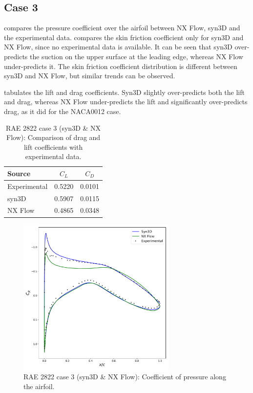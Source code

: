 \subsection{Case 3}
%
%
 compares the pressure coefficient over the airfoil between NX Flow, syn3D and the experimental data.  compares the skin friction coefficient only for syn3D and NX Flow, since no experimental data is available. It can be seen that syn3D over-predicts the suction on the upper surface at the leading edge, whereas NX Flow under-predicts it. The skin friction coefficient distribution is different between syn3D and NX Flow, but similar trends can be observed.

 tabulates the lift and drag coefficients. Syn3D slightly over-predicts both the lift and drag, whereas NX Flow under-predicts the lift and significantly over-predicts drag, as it did for the NACA0012 case.
\begin{table}
    \centering
    \caption{RAE 2822 case 3 (syn3D \& NX Flow): Comparison of drag and lift coefficients with experimental data.}
    \label{tab:raecase3}
    \begin{tabular}{@{}lcc@{}}
        \toprule
        Source & $C_L$ & $C_D$ \\
        \midrule
        Experimental & 0.5220 & 0.0101 \\
        syn3D & 0.5907 & 0.0115 \\
        NX Flow & 0.4865 & 0.0348 \\
         \bottomrule
    \end{tabular}
\end{table}
\begin{figure}
    \centering
    \includegraphics[width=0.7\textwidth]{figs/rae/cp_case3}
    \caption{RAE 2822 case 3 (syn3D \& NX Flow): Coefficient of pressure along the airfoil.}
    \label{fig:raecp3}
\end{figure}
